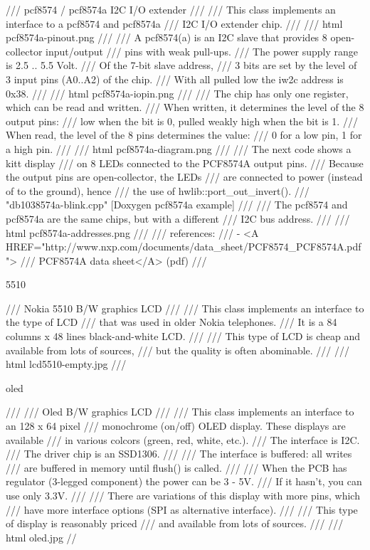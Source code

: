 /// pcf8574 / pcf8574a I2C I/O extender
///
/// This class implements an interface to a pcf8574 and pcf8574a
/// I2C I/O extender chip.
///
/// \image html pcf8574a-pinout.png
///
/// A pcf8574(a) is an I2C slave that provides 8 open-collector input/output
/// pins with weak pull-ups.
/// The power supply range is 2.5 .. 5.5 Volt.
/// Of the 7-bit slave address,
/// 3 bits are set by the level of 3 input pins (A0..A2) of the chip.
/// With all pulled low the iw2c address is 0x38.
///
/// \image html pcf8574a-iopin.png
///
/// The chip has only one register, which can be read and written.
/// When written, it determines the level of the 8 output pins:
/// low when the bit is 0, pulled weakly high when the bit is 1.
/// When read, the level of the 8 pins determines the value:
/// 0 for a low pin, 1 for a high pin.
///
/// \image html pcf8574a-diagram.png
///
/// The next code shows a kitt display
/// on 8 LEDs connected to the PCF8574A output pins.
/// Because the output pins are open-collector, the LEDs
/// are connected to power (instead of to the ground), hence
/// the use of hwlib::port_out_invert().
/// \snippet "db103\pcf8574a-blink\main.cpp" [Doxygen pcf8574a example]
///
/// The pcf8574 and pcf8574a are the same chips, but with a different
/// I2C bus address.
///
/// \image html pcf8574a-addresses.png
///
/// references:
///    - <A HREF="http://www.nxp.com/documents/data_sheet/PCF8574_PCF8574A.pdf">
///       PCF8574A data sheet</A> (pdf)
///

5510

/// Nokia 5510 B/W graphics LCD
///
/// This class implements an interface to the type of LCD
/// that was used in older Nokia telephones.
/// It is a 84 columns x 48 lines black-and-white LCD.
///
/// This type of LCD is cheap and available from lots of sources,
/// but the quality is often abominable.
///
/// \image html lcd5510-empty.jpg
///

oled

/// \brief
/// Oled B/W graphics LCD
/// \details
/// This class implements an interface to an 128 x 64 pixel
/// monochrome (on/off) OLED display. These displays are available
/// in various colcors (green, red, white, etc.).
/// The interface is I2C.
/// The driver chip is an SSD1306.
///
/// The interface is buffered: all writes
/// are buffered in memory until flush() is called.
///
/// When the PCB has regulator (3-legged component) the power can be 3 - 5V.
/// If it hasn't, you can use only 3.3V.
///
/// There are variations of this display with more pins, which
/// have more interface options (SPI as alternative interface).
///
/// This type of display is reasonably priced
/// and available from lots of sources.
///
/// \image html oled.jpg
//


